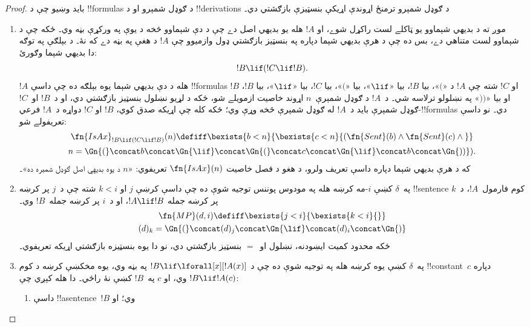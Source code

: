 \documentclass[../../../include/open-logic-section]{subfiles}
\begin{document}
\begin{proof}
بايد وښيو چې د !!{formula}s د ګوډل شمېرو او د !!{derivation}s د
ګوډل شمېرو ترمنځ اړوندې اړيکې بنسټيزې بازګشتي دي۔
\begin{enumerate}
\item موږ ته د بديهي شېماوو يو ټاکلے لست راکړل شوے، او $!A$ هله يو
  بديهي اصل دے چې د دې شېماوو څخه د يوې په ورکړې بڼه وي۔ ځکه چې د
  شېماوو لست متناهي دے، بس ده چې د هرې بديهي شېما دپاره په بنسټيز
  بازګشتي ډول وازميوو چې $!A$ د هغې په بڼه دے که نۀ۔ د بېلګې په
  توګه دا بديهي شېما وګورئ:
  \[
  !B \lif (!C \lif !B).
  \]
  $!A$ هله د دې بديهي شېما يوه بېلګه ده چې داسې !!{formula}s $!B$
  او $!C$ شته چې $!A$ د «$($»، بيا $!B$، بيا «$\lif$»، بيا «$($»،
  بيا $!C$، بيا «$\lif$»، بيا $!B$، او بيا «$))$» په نښلولو ترلاسه
  شي۔ د~$!A$ د ګوډل شمېرې~$n$ اړوند خاصيت ازمويلے شو، ځکه د لړيو
  نښلول بنسټيز بازګشتي دي، او د~$!B$ او~$!C$ ګوډل شمېرې بايد د~$!A$
  له ګوډل شمېرې څخه وړې وي؛ ځکه کله چې اړيکه صدق کوي، $!B$ او $!C$
  دواړه د~$!A$ فرعي-!!{formula}s دي۔ نو داسې تعريفولے شو:
  \begin{multline*}
  \fn{IsAx}_{!B \lif (!C \lif !B)}(n) \defiff \bexists{b< n}{
    \bexists{c < n}{(\fn{Sent}(b) \land \fn{Sent}(c) \land {}}}\\ n =
  \Gn{(} \concat b \concat \Gn{\lif} \concat \Gn{(} \concat c \concat
  \Gn{\lif} \concat b \concat \Gn{))}).
  \end{multline*}
  که د هرې بديهي شېما دپاره داسې تعريف ولرو، د هغو د فصل خاصيت
  $\fn{IsAx}(n)$ تعريفوي: «$n$ د يوه بديهي اصل ګوډل شمېره ده»۔
\item په~$\delta$ کښې $i$-مه کرښه هله په مودوس پوننس توجيه شوې ده
  چې داسې کرښې $j$ او $k<i$ شته چې د~$j$ پر کرښه !!{sentence} کوم
  فارمول~$!A$، د~$k$ پر کرښه جمله $!A\lif !B$، او د~$i$ پر کرښه
  جمله~$!B$ وي۔
  \begin{multline*}
    \fn{MP}(d, i) \defiff \bexists{j < i}{\bexists{k < i}{}}\\
    (d)_k = \Gn{(} \concat (d)_j
      \concat \Gn{\lif} \concat (d)_i \concat \Gn{)}
  \end{multline*}
  ځکه محدود کمیت ايښودنه، نښلول او~$=$ بنسټيز بازګشتي دي، نو دا
  يوه بنسټيزه بازګشتي اړيکه تعريفوي۔
\item په~$\delta$ کښې يوه کرښه هله په \QR{} توجيه شوې ده چې د
  $!B\lif\lforall[x][!A(x)]$ په بڼه وي، يوه مخکښې کرښه د کوم
  !!{constant}~$c$ دپاره $!B\lif !A(c)$ وي، او $c$ په~$!B$ کښې نۀ
  راځي۔ دا هله کېږي چې:
  \begin{enumerate}
  \item داسې !!a{sentence}~$!B$ وي؛ او

\end{enumerate}
\end{enumerate}
\end{proof}
\end{document}
